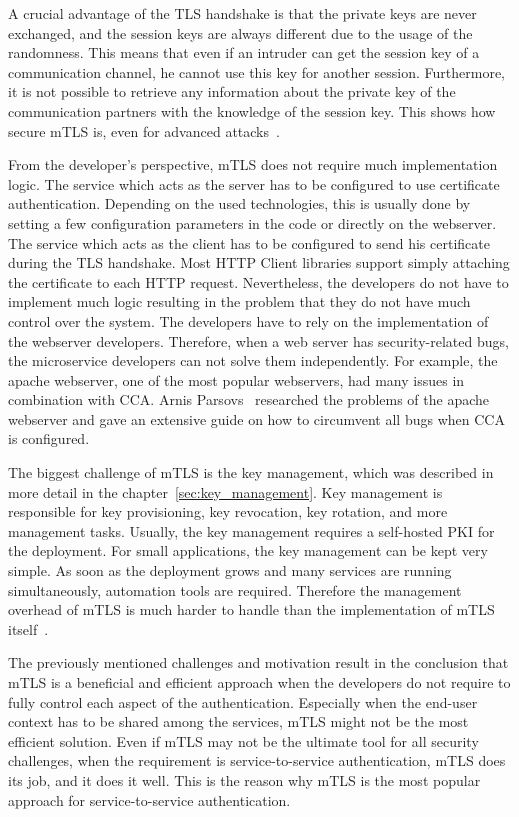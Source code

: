 A crucial advantage of the TLS handshake is that the private keys are never exchanged, and the session keys are always different due to the usage of the randomness.
This means that even if an intruder can get the session key of a communication channel, he cannot use this key for another session.
Furthermore, it is not possible to retrieve any information about the private key of the communication partners with the knowledge of the session key.
This shows how secure mTLS is, even for advanced attacks~\cite{parsovs2013practical}.

From the developer's perspective, mTLS does not require much implementation logic.
The service which acts as the server has to be configured to use certificate authentication.
Depending on the used technologies, this is usually done by setting a few configuration parameters in the code or directly on the webserver.
The service which acts as the client has to be configured to send his certificate during the TLS handshake.
Most HTTP Client libraries support simply attaching the certificate to each HTTP request.
Nevertheless, the developers do not have to implement much logic resulting in the problem that they do not have much control over the system.
The developers have to rely on the implementation of the webserver developers.
Therefore, when a web server has security-related bugs, the microservice developers can not solve them independently.
For example, the apache webserver, one of the most popular webservers, had many issues in combination with CCA.
Arnis Parsovs~\cite{parsovs2013practical} researched the problems of the apache webserver and gave an extensive guide on how to circumvent all bugs when CCA is configured.

The biggest challenge of mTLS is the key management, which was described in more detail in the chapter~\ref{sec:key_management}.
Key management is responsible for key provisioning, key revocation, key rotation, and more management tasks.
Usually, the key management requires a self-hosted PKI for the deployment.
For small applications, the key management can be kept very simple.
As soon as the deployment grows and many services are running simultaneously, automation tools are required.
Therefore the management overhead of mTLS is much harder to handle than the implementation of mTLS itself~\cite{dias2020microservices}.

The previously mentioned challenges and motivation result in the conclusion that mTLS is a beneficial and efficient approach when the developers do not require to fully control each aspect of the authentication.
Especially when the end-user context has to be shared among the services, mTLS might not be the most efficient solution.
Even if mTLS may not be the ultimate tool for all security challenges, when the requirement is service-to-service authentication, mTLS does its job, and it does it well.
This is the reason why mTLS is the most popular approach for service-to-service authentication.


